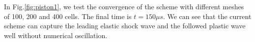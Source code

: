 \documentclass[review]{elsarticle}
\begin{document}
In Fig.\ref{fig:piston1}, we test the convergence of the scheme with different meshes of 100, 200 and 400 cells. The final time is $t = 150 \mu s $.  We can  see that the current scheme can capture the leading elastic shock wave and the followed plastic wave well without numerical oscillation.
\begin{figure}
\end{figure}
\end{document}
